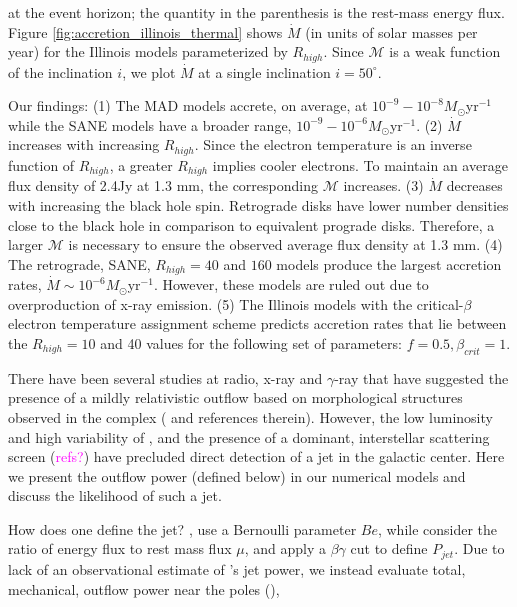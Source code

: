 at the event horizon; the quantity in the parenthesis is the rest-mass energy flux. Figure \ref{fig:accretion_illinois_thermal} shows $\dot{M}$ (in units of solar masses per year) for the Illinois models parameterized by $R_{high}$. Since $\mathcal{M}$ is a weak function of the inclination $i$, we plot $\dot{M}$ at a single inclination $i=50^{\circ}$.

Our findings: (1) The MAD models accrete, on average, at $10^{-9}-10^{-8} M_{\odot}$yr$^{-1}$ while the SANE models have a broader range, $10^{-9}-10^{-6} M_{\odot}$yr$^{-1}$. (2) $\dot{M}$ increases with increasing $R_{high}$. Since the electron temperature is an inverse function of $R_{high}$, a greater $R_{high}$ implies cooler electrons. To maintain an average flux density of 2.4Jy at 1.3 mm, the corresponding $\mathcal{M}$ increases. (3) $\dot{M}$ decreases with increasing the black hole spin. Retrograde disks have lower number densities close to the black hole in comparison to equivalent prograde disks. Therefore, a larger $\mathcal{M}$ is necessary to ensure the observed average flux density at 1.3 mm. (4) The retrograde, SANE, $R_{high}=40$ and $160$ models produce the largest accretion rates, $\dot{M}\sim 10^{-6}M_{\odot}$yr$^{-1}$. However, these models are ruled out due to overproduction of x-ray emission. (5) The Illinois models with the critical-$\beta$ electron temperature assignment scheme predicts accretion rates that lie between the $R_{high}=10$ and 40 values for the following set of parameters: $f=0.5, \beta_{crit}=1$.

There have been several studies at radio, x-ray and $\gamma$-ray that have suggested the presence of a mildly relativistic outflow  based on morphological structures observed in the \sgra complex (\citealt{2012AAS...22051303S,Li_2013,2019ApJ...875...44Z} and references therein). However, the low luminosity and high variability of \sgra, and the presence of a dominant, interstellar scattering screen (\textcolor{magenta}{refs?}) have precluded direct detection of a jet in the galactic center. Here we present the outflow power (defined below) in our numerical models and discuss the likelihood of such a jet.

How does one define the jet? \citet{refId0}, \citet{2014A&A...570A...7M} use a Bernoulli parameter $Be$, while \citealt{10.1111/j.1365-2966.2012.22002.x} consider the ratio of energy flux to rest mass flux $\mu$, and \citet{M87PaperV} apply a $\beta\gamma$ cut to define $P_{jet}$. Due to lack of an observational estimate of \sgra's jet power, we instead evaluate total, mechanical, outflow power near the poles (\cite{M87PaperV}),

